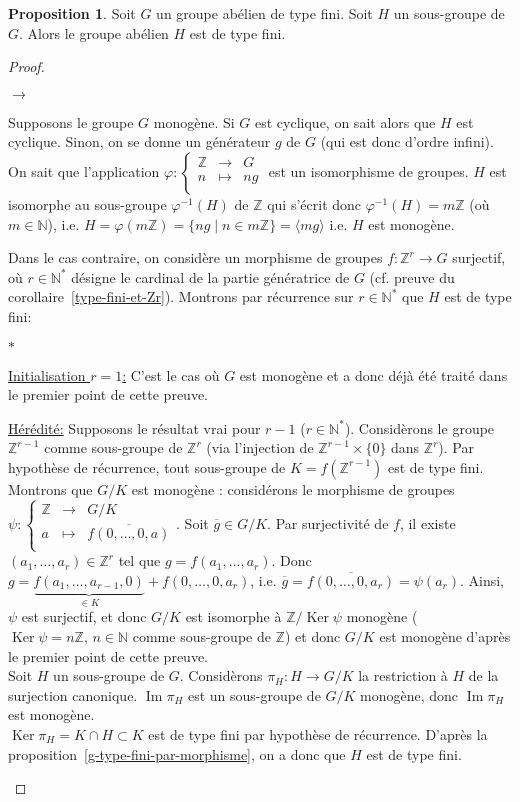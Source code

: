 \documentclass{report}
\newcommand{\Z}{\mathbb{Z}}
\newcommand{\N}{\mathbb{N}}
\newcommand{\im}{\mathop{\mathrm{Im}}\nolimits}
\renewcommand{\ker}{\mathop{\mathrm{Ker}}\nolimits}
\newenvironment{ls}{\begin{list}{$\to$}{}}{\end{list}}
\newenvironment{lls}{\begin{list}{$\ast$}{}}{\end{list}}
\theoremstyle{definition}
\newtheorem{prop}[defi]{Proposition}
\newcommand{\app}[5]{#1:\left\{\begin{array}{ccl}
#2 & \longrightarrow & #3 \\
#4 & \longmapsto & #5  \\
\end{array}\right.
}
\begin{document}
\begin{prop}
Soit $G$ un groupe abélien de type fini. Soit $H$ un sous-groupe de $G$. Alors le groupe abélien $H$ est de type fini.
\end{prop}

\begin{proof}\hspace{1em}
\begin{ls}
\item Supposons le groupe $G$ monogène. Si $G$ est cyclique, on sait alors que $H$ est cyclique. Sinon, on se donne un générateur $g$ de $G$ (qui est donc d'ordre infini). On sait que l'application $\app{\varphi}{\Z}{G}{n}{ng}$ est un isomorphisme de groupes. $H$ est isomorphe au sous-groupe $\varphi^{-1}(H)$ de $\Z$ qui s'écrit donc $\varphi^{-1}(H)=m\Z$ (où $m \in \N$), i.e. $H=\varphi(m\Z)=\{ng \mid n \in m\Z \}=\langle mg\rangle$ i.e. $H$ est monogène. 
\item Dans le cas contraire, on considère un morphisme de groupes $f:\Z^r\to G$ surjectif, où $r \in \N^*$ désigne le cardinal de la partie génératrice de $G$ (cf. preuve du corollaire~\ref{type-fini-et-Zr}). Montrons par récurrence sur $r \in \N^*$ que $H$ est de type fini:
\begin{lls}
	\item\underline{Initialisation $r=1$:} C'est le cas o\`u $G$ est monog\`ene et a donc d\'ej\`a été traité dans le premier point de cette preuve.
	\item\underline{H\'er\'edit\'e:} Supposons le résultat vrai pour $r-1$ ($r \in \N^*$). Considèrons le groupe $\Z^{r-1}$ comme sous-groupe de $\Z^r$ (via l'injection de $\Z^{r-1} \times \{0\}$ dans $\Z^{r}$). Par hypothèse de récurrence, tout sous-groupe de $K=f(\Z^{r-1})$ est de type fini. Montrons que $G/K$ est monogène : considérons le morphisme de groupes $\app{\psi}{\Z}{G/K}{a}{\overline{f(0, \ldots, 0,a)}}$. 
Soit $\overline{g} \in G/K$. Par surjectivité de $f$, il existe $(a_1, \ldots, a_r) \in \Z^r$ tel que $g=f(a_1, \ldots, a_r)$. Donc $g=\underbrace{f(a_1, \ldots, a_{r-1},0)}_{\in K}+f(0, \ldots, 0, a_r)$, i.e. $\overline{g}=\overline{f(0, \ldots, 0,a_r)}=\psi(a_r)$. Ainsi, $\psi$ est
surjectif, et donc $G/K$ est isomorphe \`a $\Z/\ker\psi$ monog\`ene ($\ker\psi=n\Z,\, n\in\N$ comme sous-groupe de $\Z$) et donc $G/K$ est monog\`ene d'apr\`es le premier point de cette preuve.\\
Soit $H$ un sous-groupe de $G$.
Considèrons $\pi_H:H\to G/K$ la restriction \`a $H$ de la surjection canonique. $\im \pi_H$ est un sous-groupe de $G/K$ monogène, donc $\im \pi_H$ est monogène.\\
$\ker \pi_H=K \cap H \subset K$ est de type fini par hypothèse de récurrence. D'après la proposition~\ref{g-type-fini-par-morphisme}, on a donc que $H$ est de type fini.
\end{lls}
\end{ls}
\end{proof}
\end{document}
